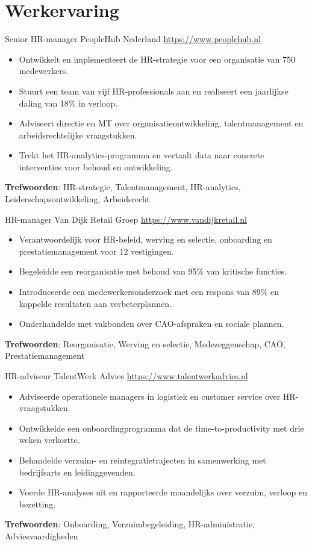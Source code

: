 \documentclass[a4paper, serif, 10pt]{moderncv}
\begin{document}
\section{Werkervaring}

        {Senior HR-manager}
        {PeopleHub Nederland}
        {\url{https://www.peoplehub.nl}}
        {}
        {\begin{itemize}
\item Ontwikkelt en implementeert de HR-strategie voor een organisatie van 750 medewerkers.
\item Stuurt een team van vijf HR-professionals aan en realiseert een jaarlijkse daling van 18\% in verloop.
\item Adviseert directie en MT over organisatieontwikkeling, talentmanagement en arbeidsrechtelijke vraagstukken.
\item Trekt het HR-analytics-programma en vertaalt data naar concrete interventies voor behoud en ontwikkeling.
\end{itemize}
\textbf{Trefwoorden}: HR-strategie, Talentmanagement, HR-analytics, Leiderschapsontwikkeling, Arbeidsrecht}

        {HR-manager}
        {Van Dijk Retail Groep}
        {\url{https://www.vandijkretail.nl}}
        {}
        {\begin{itemize}
\item Verantwoordelijk voor HR-beleid, werving en selectie, onboarding en prestatiemanagement voor 12 vestigingen.
\item Begeleidde een reorganisatie met behoud van 95\% van kritische functies.
\item Introduceerde een medewerkersonderzoek met een respons van 89\% en koppelde resultaten aan verbeterplannen.
\item Onderhandelde met vakbonden over CAO-afspraken en sociale plannen.
\end{itemize}
\textbf{Trefwoorden}: Reorganisatie, Werving en selectie, Medezeggenschap, CAO, Prestatiemanagement}

        {HR-adviseur}
        {TalentWerk Advies}
        {\url{https://www.talentwerkadvies.nl}}
        {}
        {\begin{itemize}
\item Adviseerde operationele managers in logistiek en customer service over HR-vraagstukken.
\item Ontwikkelde een onboardingprogramma dat de time-to-productivity met drie weken verkortte.
\item Behandelde verzuim- en reintegratietrajecten in samenwerking met bedrijfsarts en leidinggevenden.
\item Voerde HR-analyses uit en rapporteerde maandelijks over verzuim, verloop en bezetting.
\end{itemize}
\textbf{Trefwoorden}: Onboarding, Verzuimbegeleiding, HR-administratie, Adviesvaardigheden}
\end{document}
